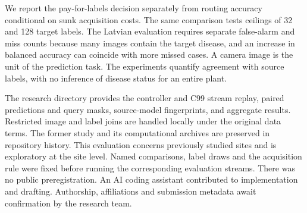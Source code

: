 \documentclass[11pt]{article}
\newcommand{\sect}[1]{\vspace{3pt}\noindent{\large\bfseries\color{teal}#1}\par}
\begin{document}
We report the pay-for-labels decision separately from routing accuracy conditional on sunk acquisition costs. The same comparison tests ceilings of 32 and 128 target labels. The Latvian evaluation requires separate false-alarm and miss counts because many images contain the target disease, and an increase in balanced accuracy can coincide with more missed cases. A camera image is the unit of the prediction task. The experiments quantify agreement with source labels, with no inference of disease status for an entire plant.

\newpage

\newpage

\newpage

\newpage
\sect{Artifact and provenance}
The research directory provides the controller and C99 stream replay, paired predictions and query masks, source-model fingerprints, and aggregate results. Restricted image and label joins are handled locally under the original data terms. The former study and its computational archives are preserved in repository history. This evaluation concerns previously studied sites and is exploratory at the site level. Named comparisons, label draws and the acquisition rule were fixed before running the corresponding evaluation streams. There was no public preregistration. An AI coding assistant contributed to implementation and drafting. Authorship, affiliations and submission metadata await confirmation by the research team.
\end{document}
